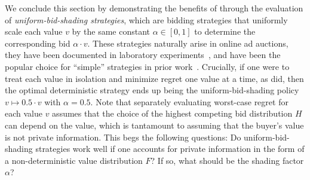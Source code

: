 We conclude this section by demonstrating the benefits of  through the evaluation of \emph{uniform-bid-shading strategies}, which are bidding strategies that uniformly scale each value $v$ by the same constant $\alpha \in [0,1]$ to determine the corresponding bid $\alpha \cdot v$. These strategies naturally arise in online ad auctions, they have been documented in laboratory experiments~\cite{bajari2005structural, filiz2007auctions}, and have been the popular choice for ``simple'' strategies in prior work~\citep{fikioris2024liquid, gaitonde2023budget}. Crucially, if one were to treat each value in isolation and minimize regret one value at a time, as \citet{kasberger2023robust} did, then the optimal deterministic strategy ends up being the uniform-bid-shading policy $v \mapsto 0.5 \cdot v$ with $\alpha = 0.5$. Note that separately evaluating worst-case regret for each value $v$ assumes that the choice of the highest competing bid distribution $H$ can depend on the value, which is tantamount to assuming that the buyer's value is not private information. This begs the following questions: Do uniform-bid-shading strategies work well if one accounts for private information in the form of a non-deterministic value distribution $F$? If so, what should be the shading factor $\alpha$? 


